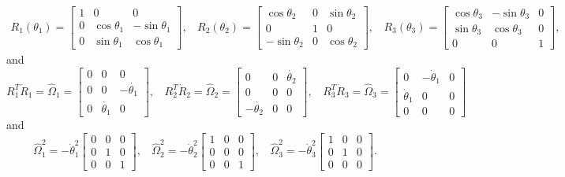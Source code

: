 \documentclass[graybox,envcountchap,sectrefs]{svmonoMuga}
\begin{document}
{\small
\begin{align}
R_1{(\theta_1)}=\left[\begin{array}{ccc}
1 & 0 & 0\\
0 & \cos{\theta_1} & -\sin{\theta_1}\\
0 & \sin{\theta_1} & \cos{\theta_1}
\end{array}\right],\:\:\:\:
R_2{(\theta_2)}=\left[\begin{array}{ccc}
\cos{\theta_2} & 0 & \sin{\theta_2}\\
0 & 1 & 0\\
- \sin{\theta_2}& 0 & \cos{\theta_2}
\end{array}\right],\:\:\:\:
R_3{(\theta_3)}=\left[\begin{array}{ccc}
\cos{\theta_3} & -\sin{\theta_3} & 0\\
\sin{\theta_3} & \cos{\theta_3} &0\\
0 & 0 & 1
\end{array}\right],\label{eq:RotatedFrames}
\end{align}
}
and
\[
R_1^T\dot{R}_1=\widehat{\Omega}_1=\left[\begin{array}{ccc}
0 & 0 & 0\\
0 & 0 & -\dot{\theta_1}\\
0 & \dot{\theta_1} & 0
\end{array}\right],\:\:\:\:
R_2^T\dot{R}_2=\widehat{\Omega}_2=\left[\begin{array}{ccc}
0 & 0 & \dot{\theta_2}\\
0 & 0 & 0\\
- \dot{\theta_2}& 0 & 0
\end{array}\right],\:\:\:\:
R_3^T\dot{R}_3=\widehat{\Omega}_3=\left[\begin{array}{ccc}
0 & -\dot{\theta}_1 & 0\\
\dot{\theta}_1 & 0 &0\\
0 & 0 & 0
\end{array}\right]
\]
and
\[
\widehat{\Omega}_1^2=-\dot{\theta}_1^2\left[\begin{array}{ccc}
0 & 0 & 0\\
0 & 1 & 0\\
0 & 0 & 1
\end{array}\right],\:\:\:\:
\widehat{\Omega}_2^2=-\dot{\theta}_2^2\left[\begin{array}{ccc}
1 & 0 & 0\\
0 & 0 & 0\\
0 & 0 & 1
\end{array}\right],\:\:\:\:
\widehat{\Omega}_3^2=-\dot{\theta}_3^2\left[\begin{array}{ccc}
1 & 0 & 0\\
0 & 1 & 0\\
0 & 0 & 0
\end{array}\right].
\]
\end{document}
